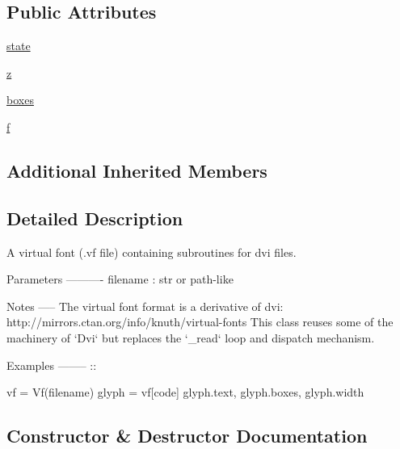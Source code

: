 \subsection*{Public Attributes}
\begin{DoxyCompactItemize}
\item 
\hyperlink{classmatplotlib_1_1dviread_1_1Vf_ae55ffc7a35d7ce2c47d40a4260a9b412}{state}
\item 
\hyperlink{classmatplotlib_1_1dviread_1_1Vf_ab1aacc9a0a6f361f83c49a423c7b6e67}{z}
\item 
\hyperlink{classmatplotlib_1_1dviread_1_1Vf_a24606acdb41250b9bb6c1644216ebe04}{boxes}
\item 
\hyperlink{classmatplotlib_1_1dviread_1_1Vf_afd82131633be30ced3501c6ae8de1a72}{f}
\end{DoxyCompactItemize}
\subsection*{Additional Inherited Members}


\subsection{Detailed Description}
\begin{DoxyVerb}A virtual font (\*.vf file) containing subroutines for dvi files.

Parameters
----------
filename : str or path-like

Notes
-----
The virtual font format is a derivative of dvi:
http://mirrors.ctan.org/info/knuth/virtual-fonts
This class reuses some of the machinery of `Dvi`
but replaces the `_read` loop and dispatch mechanism.

Examples
--------
::

    vf = Vf(filename)
    glyph = vf[code]
    glyph.text, glyph.boxes, glyph.width
\end{DoxyVerb}
 

\subsection{Constructor \& Destructor Documentation}
\mbox{\label{classmatplotlib_1_1dviread_1_1Vf_aa135c97d0461624cd3000df24f10901d}} 
